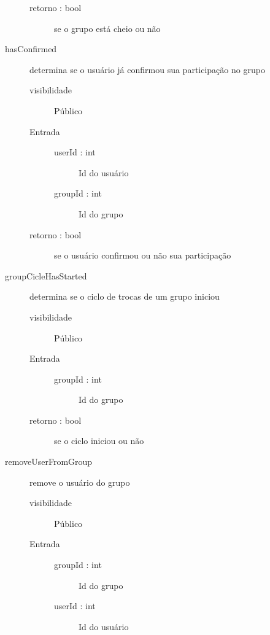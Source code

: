 \documentclass[a4paper]{article}
\begin{document}
\begin{description}
\begin{description}
			 \item [retorno : bool ] se o grupo está cheio ou não
				
			\end{description} %
			
			\item [hasConfirmed] determina se o usuário já confirmou sua participação no grupo
			\begin{description} %
			 \item [visibilidade] Público
			 \item [Entrada] \mbox{}
				\begin{description} %
				 \item [userId : int] Id do usuário
				 \item [groupId : int] Id do grupo
				\end{description} %
				
			 \item [retorno : bool ] se o usuário confirmou ou não sua participação
				
			\end{description} %
			
			\item [groupCicleHasStarted] determina se o ciclo de trocas de um grupo iniciou
			\begin{description} %
			 \item [visibilidade] Público
			 \item [Entrada] \mbox{}
				\begin{description} %
				 \item [groupId : int] Id do grupo
				\end{description} %
				
			 \item [retorno : bool ] se o ciclo iniciou ou não
				
			\end{description} %
			
			\item [removeUserFromGroup] remove o usuário do grupo
			\begin{description} %
			 \item [visibilidade] Público
			 \item [Entrada] \mbox{}
				\begin{description} %
				 \item [groupId : int] Id do grupo
				 \item [userId : int] Id do usuário
				\end{description} %
				

\end{description}
\end{description}
\end{document}
